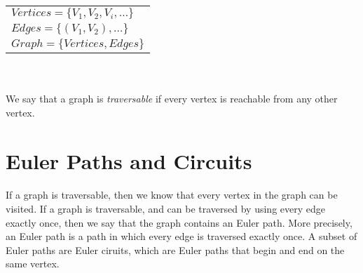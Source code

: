 \documentclass{article}
\begin{document}
\begin{center}
    \begin{tabular}{l}
        $Vertices = \{V_{1}, V_{2}, V_{i}, \dots\}$\\
        $Edges = \{(V_{1}, V_{2}), \dots\}$\\
        $Graph = \{Vertices, Edges\}$\\
    \end{tabular}\\
\end{center}



\paragraph{}
We say that a graph is \textit{traversable} if every vertex is reachable from any other vertex.


\section*{Euler Paths and Circuits}
\paragraph{}
If a graph is traversable, then we know that every vertex in the graph can be visited. If a graph is traversable, and can be traversed by using every edge exactly once, then we say that the graph contains an Euler path. More precisely, an Euler path is a path in which every edge is traversed exactly once. A subset of Euler paths are Euler ciruits, which are Euler paths that begin and end on the same vertex.
\end{document}
